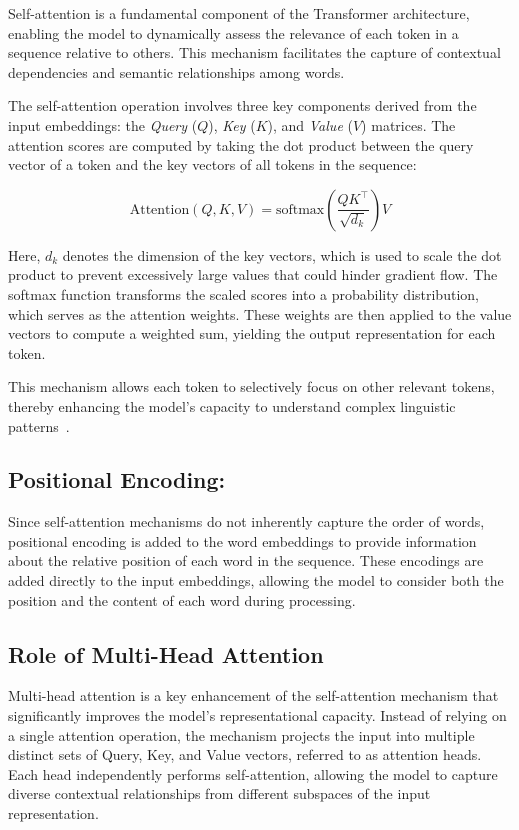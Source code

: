 Self-attention is a fundamental component of the Transformer architecture, enabling the model to dynamically assess the relevance of each token in a sequence relative to others. This mechanism facilitates the capture of contextual dependencies and semantic relationships among words.

The self-attention operation involves three key components derived from the input embeddings: the \textit{Query} ($Q$), \textit{Key} ($K$), and \textit{Value} ($V$) matrices. The attention scores are computed by taking the dot product between the query vector of a token and the key vectors of all tokens in the sequence:

\begin{equation}
	\text{Attention}(Q, K, V) = \text{softmax}\left(\frac{QK^\top}{\sqrt{d_k}}\right)V
\end{equation}

Here, $d_k$ denotes the dimension of the key vectors, which is used to scale the dot product to prevent excessively large values that could hinder gradient flow. The softmax function transforms the scaled scores into a probability distribution, which serves as the attention weights. These weights are then applied to the value vectors to compute a weighted sum, yielding the output representation for each token.

This mechanism allows each token to selectively focus on other relevant tokens, thereby enhancing the model’s capacity to understand complex linguistic patterns~\cite{vaswani2017attention}.
\subsection{Positional Encoding:}
Since self-attention mechanisms do not inherently capture the order of words, positional encoding is added to the word embeddings to provide information about the relative position of each word in the sequence.
These encodings are added directly to the input embeddings, allowing the model to consider both the position and the content of 
each word during processing\cite{alammar2018illustratedtransformer}.
\subsection{Role of Multi-Head Attention}
Multi-head attention is a key enhancement of the self-attention mechanism that significantly improves the model’s representational capacity. Instead of relying on a single attention operation, the mechanism projects the input into multiple distinct sets of Query, Key, and Value vectors, referred to as attention heads. Each head independently performs self-attention, allowing the model to capture diverse contextual relationships from different subspaces of the input representation.

